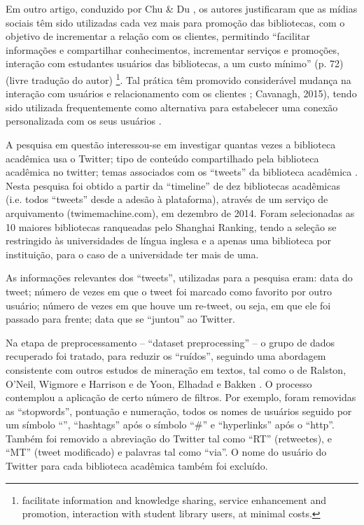 Em outro artigo, conduzido por Chu \& Du \cite{Chu2012}, os autores justificaram que as mídias sociais têm sido utilizadas cada vez mais para promoção das bibliotecas, com o objetivo de incrementar a relação com os clientes, permitindo “facilitar informações e compartilhar conhecimentos, incrementar serviços e promoções, interação com estudantes usuários das bibliotecas, a um custo mínimo” (p. 72) (livre tradução do autor) \footnote{facilitate information and knowledge sharing, service enhancement and promotion, interaction with student library users, at minimal costs.}. Tal prática têm promovido considerável mudança na interação com usuários e relacionamento com os clientes \cite{del2012libraries}; Cavanagh, 2015), tendo sido utilizada frequentemente como alternativa para estabelecer uma conexão personalizada com os seus usuários \cite{boateng2014web}. 

A pesquisa em questão interessou-se em investigar quantas vezes a biblioteca acadêmica usa o Twitter; tipo de conteúdo compartilhado pela biblioteca acadêmica no twitter; temas associados com os ``tweets'' da biblioteca acadêmica \cite{Al-Daihani2016}. Nesta pesquisa foi obtido a partir da ``timeline'' de dez bibliotecas acadêmicas (i.e. todos ``tweets'' desde a adesão à plataforma), através de um serviço de arquivamento (twimemachine.com), em dezembro de 2014. Foram selecionadas as 10 maiores bibliotecas ranqueadas pelo Shanghai Ranking, tendo a seleção se restringido às universidades de língua inglesa e a apenas uma biblioteca por instituição, para o caso de a universidade ter mais de uma. 

As informações relevantes dos ``tweets'', utilizadas para a pesquisa eram: data do tweet; número de vezes em que o tweet foi marcado como favorito por outro usuário; número de vezes em que houve um re-tweet, ou seja, em que ele foi passado para frente; data que se “juntou” ao Twitter.

Na etapa de preprocessamento -- ``dataset preprocessing'' -- o grupo de dados recuperado foi tratado, para reduzir os ``ruídos'', seguindo uma abordagem consistente com outros estudos de mineração em textos, tal como o de Ralston, O'Neil, Wigmore e Harrison \cite{ralston2014exploration} e de Yoon, Elhadad e Bakken \cite{yoon2013practical}. O processo contemplou a aplicação de certo número de filtros. Por exemplo, foram removidas as ``stopwords'', pontuação e numeração, todos os nomes de usuários seguido por um símbolo ``\@'', ``hashtags'' após o símbolo ``\#'' e ``hyperlinks'' após o ``http''. Também foi removido a abreviação do Twitter tal como ``RT'' (retweetes), e ``MT'' (tweet modificado) e palavras tal como ``via''. O nome do usuário do Twitter para cada biblioteca acadêmica também foi excluído. 

